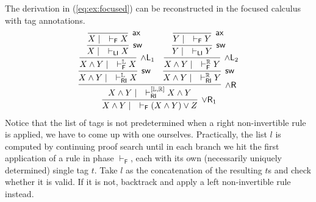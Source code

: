\documentclass[submission,copyright,creativecommons]{eptcs}
\theoremstyle{definition}
\newcommand{\andlone}{\land \mathsf{L}_{1}}
\newcommand{\andltwo}{\land \mathsf{L}_{2}}
\newcommand{\andli}{\land \mathsf{L}_{i}}
\newcommand{\andr}{\land \mathsf{R}}
\newcommand{\orrone}{\lor \mathsf{R}_{1}}
\newcommand{\ax}{\mathsf{ax}}
\newcommand{\RI}{\mathsf{RI}}
\newcommand{\LI}{\mathsf{LI}}
\newcommand{\F}{\mathsf{F}}
\newcommand{\sw}{\mathsf{sw}}
\newcommand{\tL}{\mathbb{L}}
\newcommand{\tR}{\mathbb{R}}
\begin{document}
The derivation in (\ref{eq:ex:focused}) can be reconstructed in the focused calculus with tag annotations.
\begin{equation}\label{eq:ex:tag:focused}
  \begin{array}{c}
  \infer[\orrone]{X \land Y \mid \quad \vdash_{\F} (X \land Y) \lor Z}{
    \infer[\andr]{X \land Y \mid \quad \vdash^{[ \tL , \tR ]}_{\RI} X \land Y}{
      \infer[\sw]{X \land Y \mid \quad \vdash^{\tL}_{\RI} X}{
        \infer[\andlone]{X \land Y \mid \quad \vdash^{\tL}_{\F} X}{
          \infer[\sw]{X \mid \quad \vdash_{\LI} X}{
            \infer[\ax]{X \mid \quad \vdash_{\F} X}{}
          }
        }
      }
      &
      \infer[\sw]{X \land Y \mid \quad \vdash^{\tR}_{\RI} Y}{
        \infer[\andltwo]{X \land Y \mid \quad \vdash^{\tR}_{\F} Y}{
          \infer[\sw]{Y \mid \quad \vdash_{\LI} Y}{
            \infer[\ax]{Y \mid \quad \vdash_{\F} Y}{}
          }
        }
      }
    }
  }
  \end{array}
\end{equation}
Notice that the list of tags is not predetermined when a right non-invertible rule is applied, we have to come up with one ourselves.
Practically, the list $l$ is computed by continuing proof search until in each branch we hit the first application of a rule in phase $\vdash_\F$, each with its own (necessarily uniquely determined) single tag $t$. Take $l$ as the concatenation of the resulting $t$s and check whether it is valid. If it is not, backtrack and apply a left non-invertible rule instead.
\end{document}

